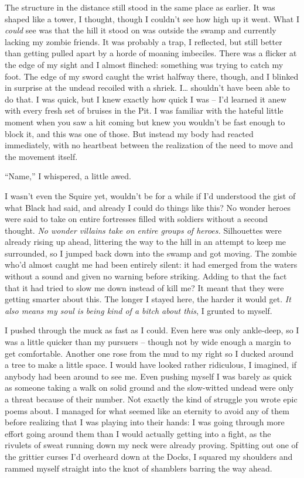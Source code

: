 \documentclass[12pt, openany]{book}
\begin{document}
The structure in the distance still stood in the same place as earlier. It was shaped like a tower, I thought, though I couldn’t see how high up it went. What I \textit{could} see was that the hill it stood on was outside the swamp and currently lacking my zombie friends. It was probably a trap, I reflected, but still better than getting pulled apart by a horde of moaning imbeciles. There was a flicker at the edge of my sight and I almost flinched: something was trying to catch my foot. The edge of my sword caught the wrist halfway there, though, and I blinked in surprise at the undead recoiled with a shriek. I… shouldn’t have been able to do that. I was quick, but I knew exactly how quick I was – I’d learned it anew with every fresh set of bruises in the Pit. I was familiar with the hateful little moment when you saw a hit coming but knew you wouldn’t be fast enough to block it, and this was one of those. But instead my body had reacted immediately, with no heartbeat between the realization of the need to move and the movement itself.

“Name,” I whispered, a little awed. 

I wasn’t even the Squire yet, wouldn’t be for a while if I’d understood the gist of what Black had said, and already I could do things like this? No wonder heroes were said to take on entire fortresses filled with soldiers without a second thought. \textit{No wonder villains take on entire groups of heroes.} Silhouettes were already rising up ahead, littering the way to the hill in an attempt to keep me surrounded, so I jumped back down into the swamp and got moving. The zombie who’d almost caught me had been entirely silent: it had emerged from the waters without a sound and given no warning before striking. Adding to that the fact that it had tried to slow me down instead of kill me? It meant that they were getting smarter about this. The longer I stayed here, the harder it would get. \textit{It also means my soul is being kind of a bitch about this}, I grunted to myself.

I pushed through the muck as fast as I could. Even here was only ankle-deep, so I was a little quicker than my pursuers – though not by wide enough a margin to get comfortable. Another one rose from the mud to my right so I ducked around a tree to make a little space. I would have looked rather ridiculous, I imagined, if anybody had been around to see me. Even pushing myself I was barely as quick as someone taking a walk on solid ground and the slow-witted undead were only a threat because of their number. Not exactly the kind of struggle you wrote epic poems about. I managed for what seemed like an eternity to avoid any of them before realizing that I was playing into their hands: I was going through more effort going around them than I would actually getting into a fight, as the rivulets of sweat running down my neck were already proving. Spitting out one of the grittier curses I’d overheard down at the Docks, I squared my shoulders and rammed myself straight into the knot of shamblers barring the way ahead.
\end{document}

